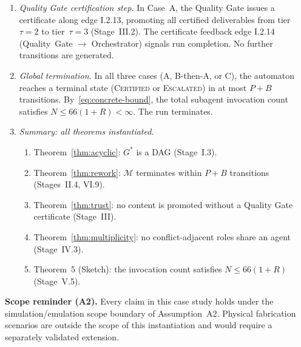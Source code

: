 \documentclass[12pt]{article}
\theoremstyle{definition}
\begin{document}
\begin{enumerate}
    \item[VI.8] \emph{Quality Gate certification step.}  In Case~A,
                the Quality Gate issues a certificate along edge
                I.2.13, promoting all certified deliverables from
                tier~$\tau = 2$ to tier~$\tau = 3$ (Stage~III.2).
                The certificate feedback edge I.2.14 (Quality~Gate
                $\to$ Orchestrator) signals run completion.  No
                further transitions are generated. \checkmark

    \item[VI.9] \emph{Global termination.}  In all three cases (A,
                B-then-A, or C), the automaton reaches a terminal
                state (\textsc{Certified} or \textsc{Escalated}) in
                at most $P + B$ transitions.  By~\eqref{eq:concrete-bound},
                the total subagent invocation count satisfies
                $N \leq 66(1+R) < \infty$.  The run terminates. \checkmark

    \item[VI.10] \emph{Summary: all theorems instantiated.}
                 \begin{enumerate}
                     \item[VI.10a] Theorem~\ref{thm:acyclic}: $G^{*}$
                                   is a DAG (Stage~I.3). \checkmark
                     \item[VI.10b] Theorem~\ref{thm:rework}: $\mathcal{M}$
                                   terminates within $P+B$ transitions
                                   (Stages~II.4, VI.9). \checkmark
                     \item[VI.10c] Theorem~\ref{thm:trust}: no content
                                   is promoted without a Quality Gate
                                   certificate (Stage~III). \checkmark
                     \item[VI.10d] Theorem~\ref{thm:multiplicity}:
                                   no conflict-adjacent roles share an
                                   agent (Stage~IV.3). \checkmark
                     \item[VI.10e] Theorem~5 (Sketch): the invocation
                                   count satisfies
                                   $N \leq 66(1+R)$
                                   (Stage~V.5). \checkmark
                 \end{enumerate}
\end{enumerate}

\medskip
\noindent\textbf{Scope reminder (A2).}  Every claim in this case
study holds under the simulation/emulation scope boundary of
Assumption~A2.  Physical fabrication scenarios are outside the scope
of this instantiation and would require a separately validated
extension.
\end{document}
